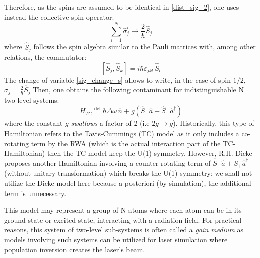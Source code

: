 \documentclass[11pt]{report}
\begin{document}
Therefore, as the spins are assumed to be identical in \eqref{dist_sig_2}, one uses instead the collective spin operator:
\begin{equation}
\label{sig_change_s}
\sum_{i=1}^{N} \hat{\sigma}_j^i \rightarrow \frac{2}{\hbar} \hat{S}_j
\end{equation}
where $\hat{S}_j$ follows the spin algebra similar to the Pauli matrices with, among other relations, the commutator:
\begin{equation}
{\displaystyle [\hat{S} _{j},\hat{S} _{k}]=i\hbar\varepsilon _{jkl}\,\hat{S} _{l}}
\end{equation}
The change of variable \eqref{sig_change_s} allows to write, in the case of spin-$1/2$, $\hat{\sigma}_j = \frac{2}{\hbar}\hat{S}_j$ Then, one obtains the following contaminant for indistinguishable N two-level systems:
\begin{equation}
H_{TC} \stackrel{\text{def}}{=} \hbar\Delta\omega\,\hat{n} + g \left(\hat{S}_+ \hat{a} + \hat{S}_-\hat{a}^{\dag} \right)
\end{equation}
where the constant $g$ \textit{swallows} a factor of 2 (i.e $2g \rightarrow g$). Historically, this type of Hamiltonian refers to the Tavis-Cummings (TC) model as it only includes a co-rotating term by the RWA (which is the actual interaction part of the TC-Hamiltonian) then the TC-model keep the U(1) symmetry. However, R.H. Dicke proposes another Hamiltonian involving a counter-rotating term of $\hat{S}_- \hat{a} + \hat{S}_+\hat{a}^{\dag}$ (without unitary transformation) which breaks the U(1) symmetry: we shall not utilize the Dicke model here because a posteriori (by simulation), the additional term is unnecessary.

This model may represent a group of N atoms where each atom can be in its ground state or excited state, interacting with a radiation field. For practical reasons, this system of two-level sub-systems is often called a \textit{gain medium} as models involving such systems can be utilized for laser simulation where population inversion creates the laser's beam.
\end{document}
